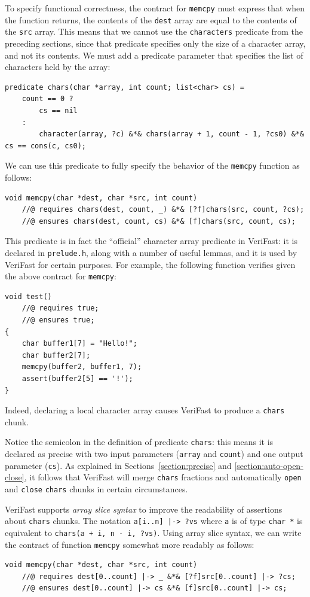 \documentclass{article}
\begin{document}
To specify functional correctness, the contract for
\lstinline|memcpy| must express that when the function returns,
the contents of the \lstinline|dest| array are equal to the
contents of the \lstinline|src| array. This means that we
cannot use the \lstinline|characters| predicate from the
preceding sections, since that predicate specifies only the
size of a character array, and not its contents. We must add a
predicate parameter that specifies the list of characters held
by the array:
\begin{lstlisting}
predicate chars(char *array, int count; list<char> cs) =
    count == 0 ?
        cs == nil
    :
        character(array, ?c) &*& chars(array + 1, count - 1, ?cs0) &*& cs == cons(c, cs0);
\end{lstlisting}
We can use this predicate to fully specify the behavior of the
\lstinline|memcpy| function as follows:
\begin{lstlisting}
void memcpy(char *dest, char *src, int count)
    //@ requires chars(dest, count, _) &*& [?f]chars(src, count, ?cs);
    //@ ensures chars(dest, count, cs) &*& [f]chars(src, count, cs);
\end{lstlisting}
This predicate is in fact the ``official'' character array
predicate in VeriFast: it is declared in \lstinline|prelude.h|,
along with a number of useful lemmas, and it is used by
VeriFast for certain purposes. For example, the following
function verifies given the above contract for
\lstinline|memcpy|:
\begin{lstlisting}
void test()
    //@ requires true;
    //@ ensures true;
{
    char buffer1[7] = "Hello!";
    char buffer2[7];
    memcpy(buffer2, buffer1, 7);
    assert(buffer2[5] == '!');
}
\end{lstlisting}
Indeed, declaring a local character array causes VeriFast to
produce a \lstinline|chars| chunk.

Notice the semicolon in the definition of predicate
\lstinline|chars|: this means it is declared as precise with
two input parameters (\lstinline|array| and \lstinline|count|)
and one output parameter (\lstinline|cs|). As explained in
Sections~\ref{section:precise} and
\ref{section:auto-open-close}, it follows that VeriFast will
merge \lstinline|chars| fractions and automatically
\lstinline|open| and \lstinline|close| \lstinline|chars| chunks
in certain circumstances.

VeriFast supports \emph{array slice syntax} to improve the
readability of assertions about \lstinline|chars| chunks. The
notation \lstinline$a[i..n] |-> ?vs$ where \lstinline|a| is of
type \lstinline|char *| is equivalent to %
\lstinline$chars(a + i, n - i, ?vs)$. Using array slice syntax,
we can write the contract of function \lstinline|memcpy|
somewhat more readably as follows:
\begin{lstlisting}
void memcpy(char *dest, char *src, int count)
    //@ requires dest[0..count] |-> _ &*& [?f]src[0..count] |-> ?cs;
    //@ ensures dest[0..count] |-> cs &*& [f]src[0..count] |-> cs;
\end{lstlisting}
\end{document}
